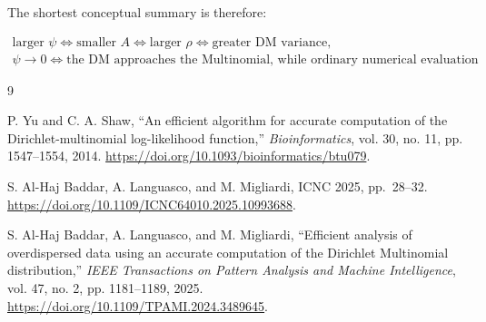 \documentclass[11pt,a4paper]{article}
\begin{document}
The shortest conceptual summary is therefore:

\[
\boxed{
\begin{gathered}
\text{larger }\psi
\Longleftrightarrow
\text{smaller }A
\Longleftrightarrow
\text{larger }\rho
\Longleftrightarrow
\text{greater DM variance},\\[0.4em]
\psi\longrightarrow0
\Longleftrightarrow
\text{the DM approaches the Multinomial, while ordinary numerical evaluation
becomes delicate.}
\end{gathered}}
\]

\begin{thebibliography}{9}

P. Yu and C. A. Shaw,
``An efficient algorithm for accurate computation of the
Dirichlet-multinomial log-likelihood function,''
\emph{Bioinformatics}, vol. 30, no. 11, pp. 1547--1554, 2014.
\url{https://doi.org/10.1093/bioinformatics/btu079}.

S. Al-Haj Baddar, A. Languasco, and M. Migliardi,
ICNC 2025, pp.~28--32.
\url{https://doi.org/10.1109/ICNC64010.2025.10993688}.

S. Al-Haj Baddar, A. Languasco, and M. Migliardi,
``Efficient analysis of overdispersed data using an accurate computation of
the Dirichlet Multinomial distribution,''
\emph{IEEE Transactions on Pattern Analysis and Machine Intelligence},
vol. 47, no. 2, pp. 1181--1189, 2025.
\url{https://doi.org/10.1109/TPAMI.2024.3489645}.

\end{thebibliography}
\end{document}
